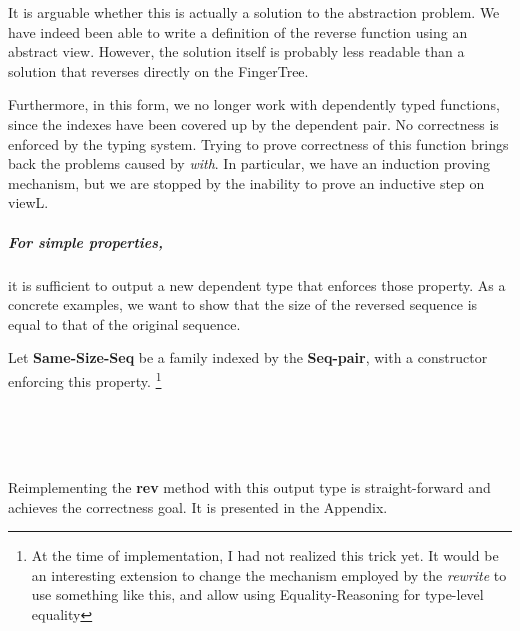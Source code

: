 \documentclass[12pt,twoside,notitlepage]{report}
\begin{document}
It is arguable whether this is actually a solution to the abstraction problem. We have indeed been able to write a definition of the reverse function using an abstract view. However, the solution itself is probably less readable than a solution that reverses directly on the FingerTree.

Furthermore, in this form, we no longer work with dependently typed functions, since the indexes have been covered up by the dependent pair. No correctness is enforced by the typing system. Trying to prove correctness of this function brings back the problems caused by \textit{with}. In particular, we have an induction proving mechanism, but we are stopped by the inability to prove an inductive step on viewL.

\subparagraph{For simple properties,} it is sufficient to output a new dependent type that enforces those property. As a concrete examples, we want to show that the size of the reversed sequence is equal to that of the original sequence.

Let \textbf{Same-Size-Seq} be a family indexed by the \textbf{Seq-pair}, with a constructor enforcing this property. \footnote{At the time of implementation, I had not realized this trick yet. It would be an interesting extension to change the mechanism employed by the \textit{rewrite} to use something like this, and allow using Equality-Reasoning for type-level equality}

\begin{code}
\\
\>[4]\<[6]%
\>[6]  \AgdaSymbol{:} \AgdaSymbol{(} \AgdaSymbol{:}  \AgdaSymbol{\{}\AgdaSymbol{\})}    \<%
\\
\>[6]\<[8]%
\>[8] \AgdaSymbol{:}  \AgdaSymbol{\{}\AgdaSymbol{\}} \AgdaSymbol{\{}\AgdaSymbol{\}}  \AgdaSymbol{(}  \AgdaSymbol{)}  \AgdaSymbol{(}  \AgdaSymbol{)}  \AgdaSymbol{(}  \AgdaSymbol{)}   \<%
\\
%
\end{code}

Reimplementing the \textbf{rev} method with this output type is straight-forward and achieves the correctness goal. It is presented in the Appendix.
\end{document}
